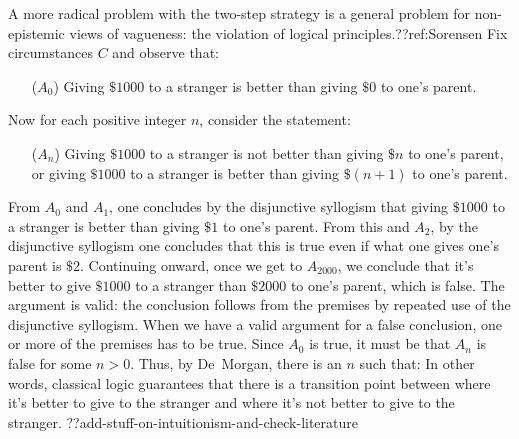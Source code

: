 A more radical problem with the two-step strategy is a general problem for non-epistemic views of vagueness: the violation
of logical principles.??ref:Sorensen Fix circumstances $C$ and observe that:
\begin{itemize}
\item[($A_0$)] Giving $ \$1000$ to a stranger is better than giving $ \$0$ to one's parent.
\end{itemize}

Now for each positive integer $n$, consider the statement:
\begin{itemize}
\item[($A_n$)] Giving $ \$1000$ to a stranger is not better than giving $ \$n$ to one's parent, or giving  $ \$1000$ to a stranger is better than giving
    $ \$(n+1)$ to one's parent.
\end{itemize}

From $A_0$ and $A_1$, one concludes by the disjunctive syllogism that giving $ \$1000$ to a stranger is better than giving $ \$1$ to one's parent.
From this and $A_2$, by the disjunctive syllogism one concludes that this is true even if what one gives one's parent is $ \$2$. Continuing onward,
once we get to $A_{2000}$, we conclude that it's better to give $ \$1000$ to a stranger than $ \$2000$ to one's parent, which is false. The argument
is valid: the conclusion follows from the premises by repeated use of the disjunctive syllogism. When we have a valid argument for a false 
conclusion, one or more of the premises has to be true. Since $A_0$ is true, it must be that $A_n$ is false for some $n>0$. Thus, by De~Morgan,
there is an $n$ such that:
In other words, classical logic guarantees that there is a transition point between where it's better to give to the stranger and where it's not better to give to the stranger.
??add-stuff-on-intuitionism-and-check-literature

